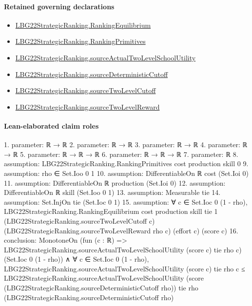 \documentclass[10pt]{article}
\begin{document}
\paragraph{Retained governing declarations}
\begin{itemize}\raggedright
\item \hyperlink{paper-prerequisite-2a1b692f4e3136c6}{LBG22\allowbreak{}Strategic\allowbreak{}Ranking.\allowbreak{}Ranking\allowbreak{}Equilibrium}
\item \hyperlink{paper-prerequisite-9bbcc12f4a1736bf}{LBG22\allowbreak{}Strategic\allowbreak{}Ranking.\allowbreak{}Ranking\allowbreak{}Primitives}
\item \hyperlink{paper-prerequisite-9d0a441d993fe3f2}{LBG22\allowbreak{}Strategic\allowbreak{}Ranking.\allowbreak{}source\allowbreak{}Actual\allowbreak{}Two\allowbreak{}Level\allowbreak{}School\allowbreak{}Utility}
\item \hyperlink{paper-prerequisite-e76c8574ddaca0dc}{LBG22\allowbreak{}Strategic\allowbreak{}Ranking.\allowbreak{}source\allowbreak{}Deterministic\allowbreak{}Cutoff}
\item \hyperlink{paper-prerequisite-f88aac58507e44ca}{LBG22\allowbreak{}Strategic\allowbreak{}Ranking.\allowbreak{}source\allowbreak{}Two\allowbreak{}Level\allowbreak{}Cutoff}
\item \hyperlink{paper-prerequisite-30d97cd43eb79017}{LBG22\allowbreak{}Strategic\allowbreak{}Ranking.\allowbreak{}source\allowbreak{}Two\allowbreak{}Level\allowbreak{}Reward}
\end{itemize}
\paragraph{Lean-elaborated claim roles}\begin{ReviewVerbatim}
1. parameter: ℝ → ℝ
2. parameter: ℝ → ℝ
3. parameter: ℝ → ℝ
4. parameter: ℝ → ℝ
5. parameter: ℝ → ℝ → ℝ
6. parameter: ℝ → ℝ → ℝ
7. parameter: ℝ
8. assumption: LBG22StrategicRanking.RankingPrimitives cost production skill 0
9. assumption: rho ∈ Set.Ioo 0 1
10. assumption: DifferentiableOn ℝ cost (Set.Ioi 0)
11. assumption: DifferentiableOn ℝ production (Set.Ioi 0)
12. assumption: DifferentiableOn ℝ skill (Set.Ioo 0 1)
13. assumption: Measurable tie
14. assumption: Set.InjOn tie (Set.Ioc 0 1)
15. assumption: ∀ c ∈ Set.Ioc 0 (1 - rho),
  LBG22StrategicRanking.RankingEquilibrium cost production skill tie 1 (LBG22StrategicRanking.sourceTwoLevelCutoff c)
    (LBG22StrategicRanking.sourceTwoLevelReward rho c) (effort c) (score c)
16. conclusion: MonotoneOn (fun (c : ℝ) => LBG22StrategicRanking.sourceActualTwoLevelSchoolUtility (score c) tie rho c)
    (Set.Ioc 0 (1 - rho)) ∧
  ∀ c ∈ Set.Ioc 0 (1 - rho),
    LBG22StrategicRanking.sourceActualTwoLevelSchoolUtility (score c) tie rho c ≤
      LBG22StrategicRanking.sourceActualTwoLevelSchoolUtility
        (score (LBG22StrategicRanking.sourceDeterministicCutoff rho)) tie rho
        (LBG22StrategicRanking.sourceDeterministicCutoff rho)
\end{ReviewVerbatim}
\end{document}
